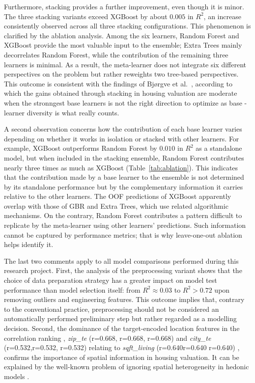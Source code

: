 \documentclass[conference]{IEEEtran}
\begin{document}
Furthermore, stacking provides a further improvement, even though it is minor. The three stacking variants exceed XGBoost by about $0.005$ in $R^{2}$, an increase consistently observed across all three stacking configurations. This phenomenon is clarified by the ablation analysis. Among the six learners, Random Forest and XGBoost provide the most valuable input to the ensemble; Extra Trees mainly decorrelates Random Forest, while the contribution of the remaining three learners is minimal. As a result, the meta-learner does not integrate six different perspectives on the problem but rather reweights two tree-based perspectives. This outcome is consistent with the findings of Bj{\o}rgve et al.~\cite{Bjrgve2025ComparingHV}, according to which the gains obtained through stacking in housing valuation are moderate when the stronngest base learners is not the right direction to optimize as base -learner diversity is what really counts. 

A second observation concerns how the contribution of each base learner varies depending on whether it works in isolation or stacked with other learners. For example, XGBoost outperforms Random Forest by $0.010$ in $R^{2}$ as a standalone model, but when included in the stacking ensemble, Random Forest contributes nearly three times as much as XGBoost (Table~\ref{tab:ablation}). This indicates that the contribution made by a base learner to the ensemble is not determined by its standalone performance but by the complementary information it carries relative to the other learners. The OOF predictions of XGBoost apparently overlap with those of GBR and Extra Trees, which use related algorithmic mechanisms. On the contrary, Random Forest contributes a pattern difficult to replicate by the meta-learner using other learners' predictions. Such information cannot be captured by performance metrics; that is why leave-one-out ablation helps identify it.

The last two comments apply to all model comparisons performed during this research project. First, the analysis of the preprocessing variant shows that the choice of data preparation strategy has a greater impact on model test performance than model selection itself: from $R^{2}\approx 0.03$ to $R^{2}>0.72$ upon removing outliers and engineering features. This outcome implies that, contrary to the conventional practice, preprocessing should not be considered an automatically performed preliminary step but rather regarded as a modelling decision. Second, the dominance of the target-encoded location features in the correlation ranking , \textit{zip\_te} (r=0.668, r=0.668, r=0.668) and \textit{city\_te} (r=0.532,r=0.532, r=0.532) relating to \textit{sqft\_living} (r=0.640r=0.640
r=0.640) , confirms the importance of spatial information in housing valuation. It can be explained by the well-known problem of ignoring spatial heterogeneity in hedonic models \cite{SELIM20092843}.
\end{document}
